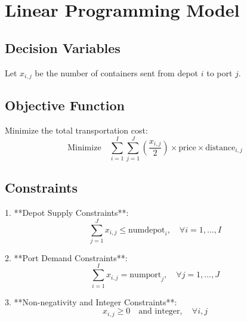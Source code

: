 \documentclass{article}
\begin{document}
\section*{Linear Programming Model}

\subsection*{Decision Variables}
Let \( x_{i,j} \) be the number of containers sent from depot \( i \) to port \( j \).

\subsection*{Objective Function}
Minimize the total transportation cost:
\[
\text{Minimize} \quad \sum_{i=1}^{I} \sum_{j=1}^{J} \left( \frac{x_{i,j}}{2} \right) \times \text{price} \times \text{distance}_{i,j}
\]

\subsection*{Constraints}

1. **Depot Supply Constraints**: 
\[
\sum_{j=1}^{J} x_{i,j} \leq \text{numdepot}_{i}, \quad \forall i = 1, \ldots, I
\]

2. **Port Demand Constraints**: 
\[
\sum_{i=1}^{I} x_{i,j} = \text{numport}_{j}, \quad \forall j = 1, \ldots, J
\]

3. **Non-negativity and Integer Constraints**: 
\[
x_{i,j} \geq 0 \quad \text{and integer}, \quad \forall i, j
\]
\end{document}
